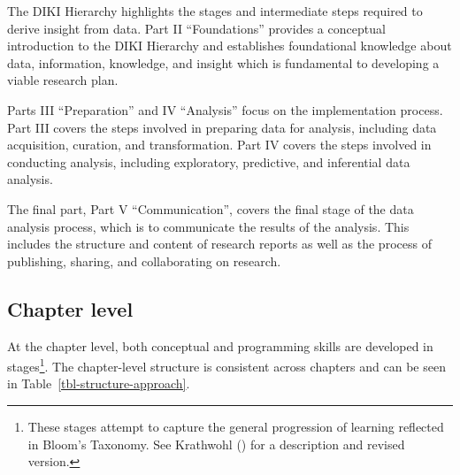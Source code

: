 \documentclass[
  letterpaper,
]{book}
\theoremstyle{definition}
\theoremstyle{remark}
\begin{document}
The DIKI Hierarchy highlights the stages and intermediate steps required
to derive insight from data. Part II ``Foundations'' provides a
conceptual introduction to the DIKI Hierarchy and establishes
foundational knowledge about data, information, knowledge, and insight
which is fundamental to developing a viable research plan.

Parts III ``Preparation'' and IV ``Analysis'' focus on the
implementation process. Part III covers the steps involved in preparing
data for analysis, including data acquisition, curation, and
transformation. Part IV covers the steps involved in conducting
analysis, including exploratory, predictive, and inferential data
analysis.

The final part, Part V ``Communication'', covers the final stage of the
data analysis process, which is to communicate the results of the
analysis. This includes the structure and content of research reports as
well as the process of publishing, sharing, and collaborating on
research.

\subsection*{Chapter level}\label{sec-preface-structure-chapter}

At the chapter level, both conceptual and programming skills are
developed in stages\footnote{These stages attempt to capture the general
  progression of learning reflected in Bloom's Taxonomy. See Krathwohl
  () for a description and revised
  version.}. The chapter-level structure is consistent across chapters
and can be seen in Table~\ref{tbl-structure-approach}.
\end{document}
